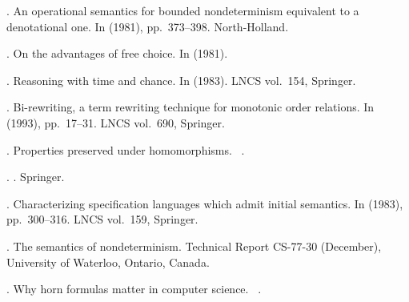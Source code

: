 {\begin{thebibliography}{}
 .
\newblock An operational semantics for bounded nondeterminism equivalent to a
  denotational one.
\newblock In 
  (1981), pp.\  373--398. North-Holland.

 .
\newblock On the advantages of free choice.
\newblock In  (1981).

 .
\newblock Reasoning with time and chance.
\newblock In  (1983). LNCS
  vol.~154, Springer.

 .
\newblock Bi-rewriting, a term rewriting technique for monotonic order
  relations.
\newblock In  (1993), pp.\  17--31. LNCS vol.~690, Springer.

 .
\newblock Properties preserved under homomorphisms.
\newblock {}~.

 .
\newblock {}.
\newblock Springer.

 .
\newblock Characterizing specification languages which admit initial semantics.
\newblock In  (1983), pp.\  300--316. LNCS vol.~159,
  Springer.

 .
\newblock The semantics of nondeterminism.
\newblock Technical Report CS-77-30 (December), University of Waterloo,
  Ontario, Canada.

 .
\newblock Why horn formulas matter in computer science.
\newblock {}~.


\end{thebibliography}}
